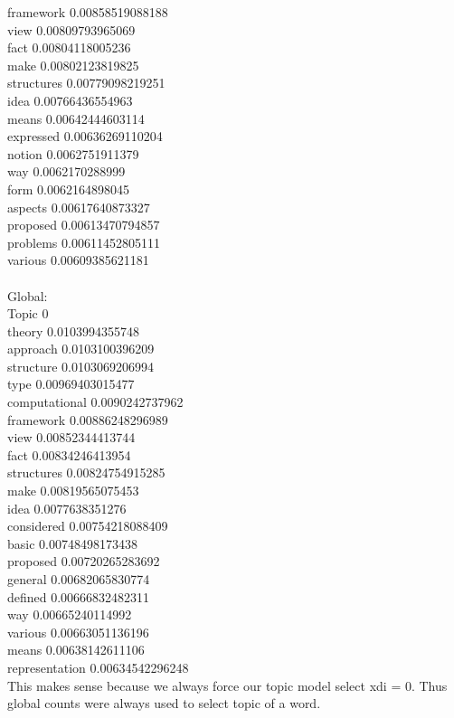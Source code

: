 \documentclass{article}
\begin{document}
{framework 0.00858519088188\\
view 0.00809793965069\\
fact 0.00804118005236\\
make 0.00802123819825\\
structures 0.00779098219251\\
idea 0.00766436554963\\
means 0.00642444603114\\
expressed 0.00636269110204\\
notion 0.0062751911379\\
way 0.0062170288999\\
form 0.0062164898045\\
aspects 0.00617640873327\\
proposed 0.00613470794857\\
problems 0.00611452805111\\
various 0.00609385621181\\
\\
Global:\\
Topic 0\\
theory 0.0103994355748\\
approach 0.0103100396209\\
structure 0.0103069206994\\
type 0.00969403015477\\
computational 0.0090242737962\\
framework 0.00886248296989\\
view 0.00852344413744\\
fact 0.00834246413954\\
structures 0.00824754915285\\
make 0.00819565075453\\
idea 0.0077638351276\\
considered 0.00754218088409\\
basic 0.00748498173438\\
proposed 0.00720265283692\\
general 0.00682065830774\\
defined 0.00666832482311\\
way 0.00665240114992\\
various 0.00663051136196\\
means 0.00638142611106\\
representation 0.00634542296248\\

This makes sense because we always force our topic model select xdi = 0. Thus global counts were always used to select topic of a word.

}
\end{document}
